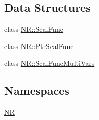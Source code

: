 \subsection*{Data Structures}
\begin{DoxyCompactItemize}
\item 
class \mbox{\hyperlink{classNR_1_1ScalFunc}{N\+R\+::\+Scal\+Func}}
\item 
class \mbox{\hyperlink{classNR_1_1PtrScalFunc}{N\+R\+::\+Ptr\+Scal\+Func}}
\item 
class \mbox{\hyperlink{classNR_1_1ScalFuncMultiVars}{N\+R\+::\+Scal\+Func\+Multi\+Vars}}
\end{DoxyCompactItemize}
\subsection*{Namespaces}
\begin{DoxyCompactItemize}
\item 
 \mbox{\hyperlink{namespaceNR}{NR}}
\end{DoxyCompactItemize}
